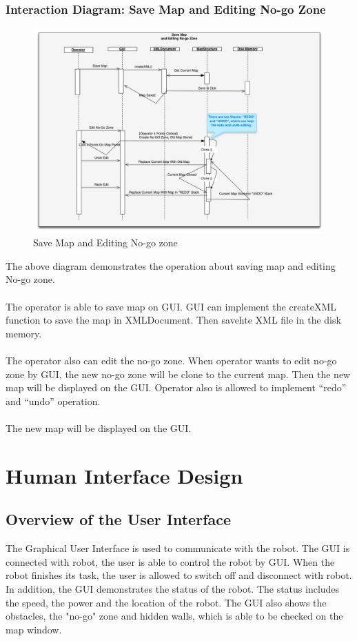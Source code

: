 \documentclass[11pt, a4paper]{report}
\begin{document}
\subsection{Interaction Diagram: Save Map and Editing No-go Zone}
\begin{figure}[h]
  \centering
    \includegraphics[width=16cm]{Seq4.png}
  \caption{Save Map and Editing No-go zone}
\end{figure}
The above diagram demonstrates the operation about saving map and editing No-go zone. \\ \\
The operator is able to save map on GUI. GUI can implement the createXML function to save the map in XMLDocument. Then savehte XML file in the disk memory. \\ \\
The operator also can edit the no-go zone. When operator wants to edit no-go zone by GUI, the new no-go zone will be clone to the current map. Then the new map will be displayed on the GUI. Operator also is allowed to implement ``redo'' and ``undo'' operation.\\ \\
The new map will be displayed on the GUI.


\chapter{Human Interface Design}%
\label{cha:HID}

\section{Overview of the User Interface}
The Graphical User Interface is used to communicate with the robot. The GUI is connected with robot, the user is able to control the robot by GUI. When the robot finishes its task, the user is allowed to switch off and disconnect with robot. In addition, the GUI demonstrates the status of the robot. The status includes the speed, the power and the location of the robot. The GUI also shows the obstacles, the "no-go" zone and hidden walls, which is able to be checked on the map window.\\
\end{document}
